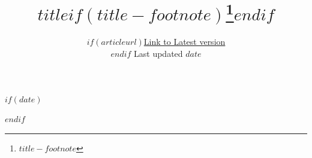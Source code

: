 %
%
%

\def\spacingset#1{\renewcommand{\baselinestretch}%
{#1}\small\normalsize} \spacingset{1}

$if(date)$
\date{$if(articleurl)$\href{$articleurl$}{Link to Latest version}\\ \vspace{1em} $endif$ Last updated $date$}
$endif$

\title{$title$$if(title-footnote)$\thanks{$title-footnote$}$endif$}

